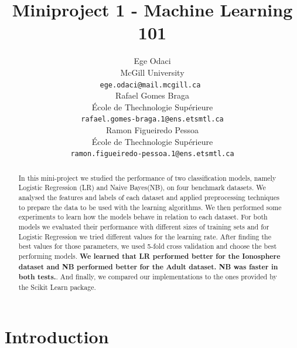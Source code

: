 \documentclass{article}
\title{Miniproject 1 - Machine Learning 101}
\author{
  Ege Odaci\\
  McGill University\\
  \texttt{ege.odaci@mail.mcgill.ca } \\
  \And
  Rafael Gomes Braga\\
  École de Thechnologie Supérieure\\
  \texttt{rafael.gomes-braga.1@ens.etsmtl.ca} \\
  \And
  Ramon Figueiredo Pessoa\\
  École de Thechnologie Supérieure\\
  \texttt{ramon.figueiredo-pessoa.1@ens.etsmtl.ca}
}
\begin{document}
\maketitle

\begin{abstract}
 In this mini-project we studied the performance of two classification models, namely Logistic Regression (LR) and Naive Bayes(NB), on four benchmark datasets. We analysed the features and labels of each dataset and applied preprocessing techniques to prepare the data to be used with the learning algorithms. We then performed some experiments to learn how the models behave in relation to each dataset. For both models we evaluated their performance with different sizes of training sets and for Logistic Regression we tried different values for the learning rate. After finding the best values for those parameters, we used 5-fold cross validation and choose the best performing models. \textbf{We learned that LR performed better for the Ionosphere dataset and NB performed better for the Adult dataset. NB was faster in both tests.}. And finally, we compared our implementations to the ones provided by the Scikit Learn package.
\end{abstract}


\section{Introduction}
\end{document}
